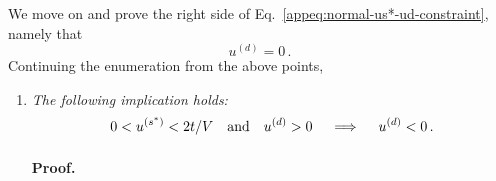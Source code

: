 \begin{tabproof}
We move on and prove the right side of Eq.~\eqref{appeq:normal-us*-ud-constraint}, namely that
\[
	u^{(d)} = 0 \, .
\]
Continuing the enumeration from the above points,

\begin{enumerate}
	\setcounter{enumi}{\theenumTemp}
	\item \textit{The following implication holds:}
	\begin{equation}\label{appeq:normal-us*-absurd-9}
		0 < u^{(s^*)} < 2t/V
		\qq{and}
		u^{(d)} > 0
		\quad\implies\quad
		u^{(d)} < 0 \, .
	\end{equation}
	
	\paragraph{Proof.}
	

\end{enumerate}
\end{tabproof}
